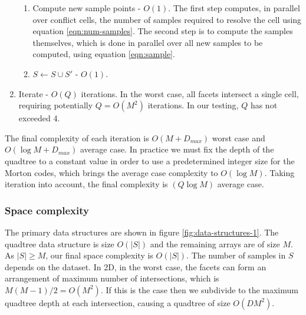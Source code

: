 \documentclass[final,3p,times,twocolumn]{elsarticle}
\begin{document}
\begin{enumerate}
  \begin{enumerate}
  \item Compute new sample points - $O(1)$. The first step computes, in parallel over conflict cells, the number of samples required to resolve the cell using equation \eqref{eqn:num-samples}. The second step is to compute the samples themselves, which is done in parallel over all new samples to be computed, using equation \eqref{eqn:sample}.
  \item $S \leftarrow S \cup S'$ - $O(1)$.
  \end{enumerate}
\item Iterate - $O(Q)$ iterations. In the worst case, all facets intersect a single cell, requiring potentially $Q=O(M^2)$ iterations. In our testing, $Q$ has not exceeded 4.
\end{enumerate}

The final complexity of each iteration is $O(M+D_{max})$ worst case and $O(\log{M}+D_{max})$ average case. In practice we must fix the depth of the quadtree to a constant value in order to use a predetermined integer size for the Morton codes, which brings the average case complexity to $O(\log{M})$. Taking iteration into account, the final complexity is $(Q\log{M})$ average case.

\subsubsection{Space complexity}

The primary data structures are shown in figure \ref{fig:data-structures-1}. The quadtree data structure is size $O(|S|)$ and the remaining arrays are of size $M$. As $|S| \ge M$, our final space complexity is $O(|S|)$. The number of samples in $S$ depends on the dataset. In 2D, in the worst case, the facets can form an arrangement of maximum number of intersections, which is $M(M-1)/2 = O(M^2)$. If this is the case then we subdivide to the maximum quadtree depth at each intersection, causing a quadtree of size $O(DM^2)$. %
\end{document}
